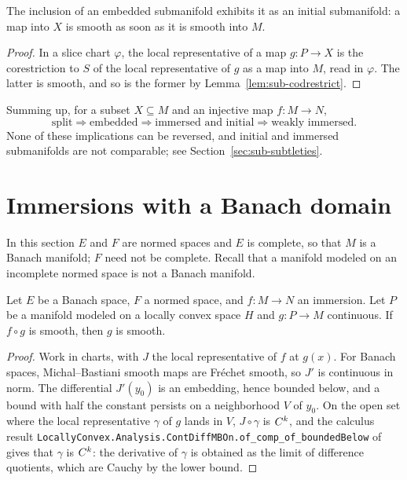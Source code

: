 \begin{theorem}
  \label{thm:sub-inclusion-initial}
  \leanok
  The inclusion of an embedded submanifold exhibits it as an initial submanifold: a map into
  $X$ is smooth as soon as it is smooth into $M$.
\end{theorem}

\begin{proof}
  \leanok
  In a slice chart $\varphi$, the local representative of a map $g \colon P \to X$ is the
  corestriction to $S$ of the local representative of $g$ as a map into $M$, read in
  $\varphi$. The latter is smooth, and so is the former by Lemma~\ref{lem:sub-codrestrict}.
\end{proof}

Summing up, for a subset $X \subseteq M$ and an injective map $f \colon M \to N$,
\[
  \text{split} \Rightarrow \text{embedded} \Rightarrow
  \text{immersed and initial} \Rightarrow \text{weakly immersed}.
\]
None of these implications can be reversed, and initial and immersed submanifolds are not
comparable; see Section~\ref{sec:sub-subtleties}.

\section{Immersions with a Banach domain}

In this section $E$ and $F$ are normed spaces and $E$ is complete, so that $M$ is a Banach
manifold; $F$ need not be complete. Recall that a manifold modeled on an incomplete normed space
is not a Banach manifold.

\begin{theorem}
  \label{thm:sub-banach-reflect}
  \leanok
  Let $E$ be a Banach space, $F$ a normed space, and $f \colon M \to N$ an immersion. Let $P$
  be a manifold modeled on a locally convex space $H$ and $g \colon P \to M$ continuous. If
  $f \circ g$ is smooth, then $g$ is smooth.
\end{theorem}

\begin{proof}
  \leanok
  Work in charts, with $J$ the local representative of $f$ at $g(x)$. For Banach spaces,
  Michal--Bastiani smooth maps are Fréchet smooth, so $J'$ is continuous in norm. The
  differential $J'(y_0)$ is an embedding, hence bounded below, and a bound with half the
  constant persists on a neighborhood $V$ of $y_0$. On the open set where the local
  representative $\gamma$ of $g$ lands in $V$, $J \circ \gamma$ is $C^{k}$, and the calculus
  result \texttt{LocallyConvex.Analysis.ContDiffMBOn.of\_comp\_of\_boundedBelow} of \cite{LCA} gives that
  $\gamma$ is $C^{k}$: the derivative of $\gamma$ is obtained as the limit of difference
  quotients, which are Cauchy by the lower bound.
\end{proof}


